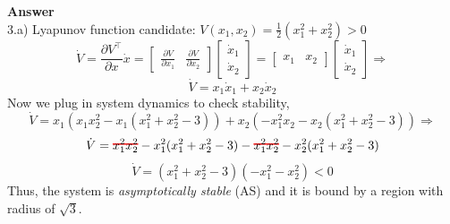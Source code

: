 \documentclass{homeworg}
\newcommand\hcancel[2][black]{\setbox0=\hbox{$#2$}%
\rlap{\raisebox{.45\ht0}{\textcolor{#1}{\rule{\wd0}{1pt}}}}#2}
\begin{document}
\noindent
\textbf{Answer} \\
3.a) Lyapunov function candidate: \( V(x_1, x_2) = \frac{1}{2} (x_1^2 + x_2^2) > 0\)
\begin{equation*}
\dot{V} = \frac{\partial V^\top}{\partial x} \dot{x} =
\begin{bmatrix}
\frac{\partial V}{\partial x_1} & \frac{\partial V}{\partial x_2}
\end{bmatrix}
\begin{bmatrix}
\dot{x}_1 \\
\dot{x}_2
\end{bmatrix}
=
\begin{bmatrix}
  x_1 & x_2
  \end{bmatrix}
  \begin{bmatrix}
  \dot{x}_1 \\
  \dot{x}_2
  \end{bmatrix}
  \Rightarrow
\end{equation*}
\begin{equation*}
\dot{V} =
  x_1 \dot{x}_1 + x_2 \dot{x}_2
\end{equation*}
Now we plug in system dynamics to check stability,
\begin{equation*}
  \dot{V} = x_1 (x_1 x_2^2 - x_1 (x_1^2 + x_2^2 -3)) + x_2(-x_1^2 x_2 - x_2(x_1^2 + x_2^2 -3)) \Rightarrow
\end{equation*}
\begin{equation*}
  \dot{V} = \hcancel[red]{x_1^2 x_2^2} - x_1^2(x_1^2 + x_2^2 -3) - \hcancel[red]{x_1^2 x_2^2} - x_2^2(x_1^2 + x_2^2 -3)
\end{equation*}
\begin{equation*}
  \dot{V} = (x_1^2 + x_2^2 -3)(- x_1^2 - x_2^2) < 0
\end{equation*}
Thus, the system is \emph{asymptotically stable} (AS) and it is bound by a region
with radius of \(\sqrt{3}\).
\end{document}
